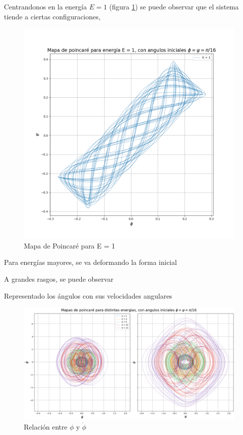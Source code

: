 \documentclass[11pt, twoside]{article} %
\begin{document}
Centrandonos en la energía $E = 1$ (figura \ref{fig:poincare_energia_1}) 
se puede observar que el sistema tiende a ciertas configuraciones, 

\begin{figure}
    \centering
    \includegraphics[width=\textwidth]{plots/poincare_energias_1.png}
    \caption{Mapa de Poincaré para E = 1}
    \label{fig:poincare_energia_1}
\end{figure}

Para energías mayores, se va deformando la forma inicial 

A grandes rasgos, se puede observar 


Representado los ángulos con sus velocidades angulares

\begin{figure}
    \centering
    \includegraphics[width=\textwidth]{plots/poincare_energias_phi_psi.png}
    \caption{Relación entre $\phi$ y $\dot{\phi}$}
    \label{fig:poincare_energias_phi}
\end{figure}
\end{document}

